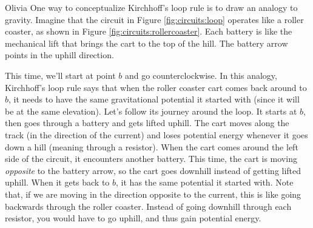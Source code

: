 \begin{studentOpinion}{Olivia}
One way to conceptualize Kirchhoff's loop rule is to draw an analogy to gravity. Imagine that the circuit in Figure \ref{fig:circuits:loop} operates like a roller coaster, as shown in Figure \ref{fig:circuits:rollercoaster}. Each battery is like the mechanical lift that brings the cart to the top of the hill. The battery arrow points in the uphill direction. 

This time, we'll start at point $b$ and go counterclockwise. In this analogy, Kirchhoff's loop rule says that when the roller coaster cart comes back around to $b$, it needs to have the same gravitational potential it started with (since it will be at the same elevation). Let's follow its journey around the loop. It starts at $b$, then goes through a battery and gets lifted uphill. The cart moves along the track (in the direction of the current) and loses potential energy whenever it goes down a hill (meaning through a resistor). When the cart comes around the left side of the circuit, it encounters another battery. This time, the cart is moving \textit{opposite} to the battery arrow, so the cart goes downhill instead of getting lifted uphill. When it gets back to $b$, it has the same potential it started with. Note that, if we are moving in the direction opposite to the current, this is like going backwards through the roller coaster. Instead of going downhill through each resistor, you would have to go uphill, and thus gain potential energy.
\end{studentOpinion}

